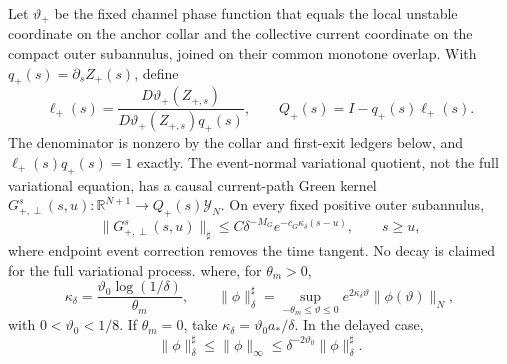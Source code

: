 \begin{lemma}
Let \(\vartheta_+\) be the fixed channel phase function that equals the
local unstable coordinate on the anchor collar and the collective current
coordinate on the compact outer subannulus, joined on their common monotone
overlap.  With \(q_+(s)=\partial_sZ_+(s)\), define
\begin{equation}
 \ell_+(s)
 =\frac{D\vartheta_+(Z_{+,s})}
        {D\vartheta_+(Z_{+,s})q_+(s)},\qquad
 Q_+(s)=I-q_+(s)\ell_+(s).                            \label{eq:anchor-positive-event-projection}
\end{equation}
The denominator is nonzero by the collar and first-exit ledgers below, and
\(\ell_+(s)q_+(s)=1\) exactly.  The event-normal variational quotient, not
the full variational equation, has a causal current-path Green kernel
\(G_{+,\perp}^s(s,u):\mathbb R^{N+1}\to Q_+(s)\mathscr Y_N\).  On every fixed
positive outer subannulus,
\begin{equation}
 \|G_{+,\perp}^s(s,u)\|_{\sharp}
 \le C\delta^{-M_G}
       e^{-c_G\kappa_\delta(s-u)},\qquad s\ge u,       \label{eq:anchor-positive-causal-Green}
\end{equation}
where endpoint event correction removes the time tangent.  No decay is
claimed for the full variational process.
where, for \(\theta_m>0\),
\begin{equation}
 \kappa_\delta
 =\frac{\vartheta_0\log(1/\delta)}{\theta_m},
 \qquad
 \|\phi\|_\delta^\sharp
 =\sup_{-\theta_m\le\vartheta\le0}
       e^{2\kappa_\delta\vartheta}\|\phi(\vartheta)\|_N,
                                                               \label{eq:anchor-annulus-fading-norm}
\end{equation}
with \(0<\vartheta_0<1/8\).  If \(\theta_m=0\), take
\(\kappa_\delta=\vartheta_0a_*/\delta\).  In the delayed case,
\begin{equation}
 \|\phi\|_\delta^\sharp\le\|\phi\|_\infty
 \le\delta^{-2\vartheta_0}\|\phi\|_\delta^\sharp.     \label{eq:anchor-annulus-norm-equivalence}
\end{equation}


\end{lemma}
